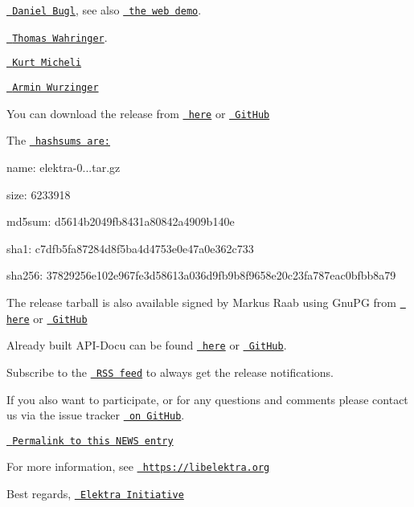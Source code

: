 \begin{DoxyItemize}
\item \href{https://www.libelektra.org/ftp/elektra/publications/bugl2018web.pdf}{\texttt{ Daniel Bugl}}, see also \href{https://webdemo.libelektra.org/}{\texttt{ the web demo}}.
\item \href{https://www.libelektra.org/ftp/elektra/publications/wahringer2018notification.pdf}{\texttt{ Thomas Wahringer}}.
\item \href{https://www.libelektra.org/ftp/elektra/publications/micheli2018hybrid.pdf}{\texttt{ Kurt Micheli}}
\item \href{http://repositum.tuwien.ac.at/urn:nbn:at:at-ubtuw:1-115452}{\texttt{ Armin Wurzinger}}
\end{DoxyItemize}

You can download the release from \href{https://www.libelektra.org/ftp/elektra/releases/elektra-0.8.25.tar.gz}{\texttt{ here}} or \href{https://github.com/ElektraInitiative/ftp/blob/master/releases/elektra-0.8.25.tar.gz?raw=true}{\texttt{ Git\+Hub}}

The \href{https://github.com/ElektraInitiative/ftp/blob/master/releases/elektra-0.8.25.tar.gz.hashsum?raw=true}{\texttt{ hashsums are\+:}}


\begin{DoxyItemize}
\item name\+: elektra-\/0...\+tar.\+gz
\item size\+: 6233918
\item md5sum\+: d5614b2049fb8431a80842a4909b140e
\item sha1\+: c7dfb5fa87284d8f5ba4d4753e0e47a0e362c733
\item sha256\+: 37829256e102e967fe3d58613a036d9fb9b8f9658e20c23fa787eac0bfbb8a79
\end{DoxyItemize}

The release tarball is also available signed by Markus Raab using Gnu\+PG from \href{https://www.libelektra.org/ftp/elektra/releases/elektra-0.8.25.tar.gz.gpg}{\texttt{ here}} or \href{https://github.com/ElektraInitiative/ftp/blob/master/releases//elektra-0.8.25.tar.gz.gpg?raw=true}{\texttt{ Git\+Hub}}

Already built A\+P\+I-\/\+Docu can be found \href{https://doc.libelektra.org/api/0.8.25/html/}{\texttt{ here}} or \href{https://github.com/ElektraInitiative/doc/tree/master/api/0.8.25}{\texttt{ Git\+Hub}}.

Subscribe to the \href{https://www.libelektra.org/news/feed.rss}{\texttt{ R\+SS feed}} to always get the release notifications.

If you also want to participate, or for any questions and comments please contact us via the issue tracker \href{http://issues.libelektra.org}{\texttt{ on Git\+Hub}}.

\href{https://www.libelektra.org/news/0.8.25-release}{\texttt{ Permalink to this N\+E\+WS entry}}

For more information, see \href{https://libelektra.org}{\texttt{ https\+://libelektra.\+org}}

Best regards, \href{https://www.libelektra.org/developers/authors}{\texttt{ Elektra Initiative}} 